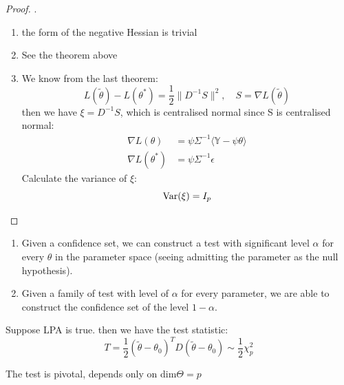 \begin{proof}.
	\begin{enumerate}
		\item the form of the negative Hessian is trivial
		\item See the theorem above
		\item We know from the last theorem:
			\begin{equation*}
				L(\tilde{\theta}) - L(\theta^*) = \frac{1}{2} \| D^{-1} S \|^{2}, \quad S = \nabla L(\tilde{\theta})
			\end{equation*}
			then we have $\xi = D^{-1} S$, which is centralised normal since S is centralised normal:
			\begin{align*}
				\nabla L(\theta) &= \psi \Sigma^{-1} \langle \mathbb{Y} - \psi \theta \rangle \\
				\nabla L(\theta^*) &= \psi \Sigma^{-1} \epsilon 
			\end{align*}
			Calculate the variance of $\xi$:
			\begin{equation*}
				\operatorname{Var}(\xi) = I_p
			\end{equation*}
	\end{enumerate}
\end{proof}

\begin{theorem}
\begin{enumerate}
    \item Given a confidence set, we can construct a test with significant level $\alpha$ for every $\theta$ in the parameter space (seeing admitting the parameter as the null hypothesis).
    \item Given a family of test with level of $\alpha$ for every parameter, we are able to construct the confidence set of the level $1 - \alpha$. 
\end{enumerate}
\end{theorem}


\begin{theorem}
	Suppose LPA is true. then we have the test statistic:
	\begin{equation*}
		T = \frac{1}{2} (\tilde{\theta} - \theta_0)^T D (\tilde{\theta} - \theta_0) \sim \frac{1}{2} \chi_p^2
	\end{equation*}
\end{theorem}
\begin{remark}
The test is pivotal, depends only on dim$\Theta = p$	
\end{remark}


